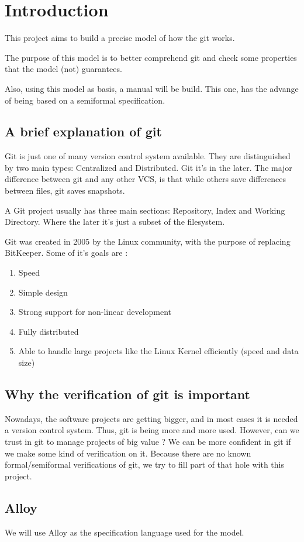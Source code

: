 \section{Introduction}

This project aims to build a precise model of how the git works. \par
The purpose of this model is to better comprehend git and 
check some properties that the model (not) guarantees. \par
Also, using this model as basis, a manual will be build. This one,
has the advange of being based on a semiformal specification.

\subsection{A brief explanation of git}

Git is just one of many \Gls{version control system} available. 
They are 
distinguished by two main types: Centralized and Distributed.
Git it's in the later. The major difference between git and any
other VCS, is that while others save differences between files, git saves
snapshots. \par
A Git project usually has three main sections: Repository, Index and
Working Directory. 
Where the later it's just a subset of the filesystem. \par
Git was created in 2005 by the Linux community, 
with the purpose of replacing BitKeeper. Some of it's
goals are \cite{progit}: 

\begin{enumerate}
	\item Speed
	\item Simple design
	\item Strong support for non-linear development
	\item Fully distributed
	\item Able to handle large projects like the Linux Kernel 
	efficiently (speed and data size)
\end{enumerate}

\subsection{Why the verification of git is important}

Nowadays, the software projects are getting bigger, and in most
cases it is needed a version control system. Thus, git is being
more and more used. However, can we trust in git to manage projects
of big value ? We can be
more confident in git if we make some kind of verification on it. Because
there are no known formal/semiformal verifications of git, we try to fill
part of that hole with this project.

\subsection{Alloy}
We will use Alloy as the specification language used for the model.
